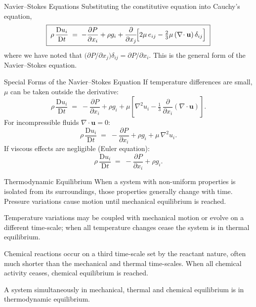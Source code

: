 \documentclass[10pt,aspectratio=43]{beamer}
\newcommand{\D}{\mathrm{D}}
\newcommand{\pd}[2]{\frac{\partial #1}{\partial #2}}
\newcommand{\bu}{\mathbf{u}}
\newcommand{\divg}{\nabla\!\cdot}
\begin{document}
\begin{frame}{Navier--Stokes Equations}
  Substituting the constitutive equation into Cauchy's equation,
  \[
    \boxed{\;\rho\,\frac{\D u_{i}}{\D t}
       \;=\; -\pd{P}{x_{i}} + \rho g_{i}
             + \pd{}{x_{j}}\!\Bigl[2\mu\,e_{ij} - \tfrac{2}{3}\mu\,(\divg\bu)\,\delta_{ij}\Bigr]\;}
  \]
  where we have noted that $\bigl(\partial P/\partial x_{j}\bigr)\delta_{ij}=\partial P/\partial x_{i}$.
  This is the general form of the Navier--Stokes equation.
\end{frame}

\begin{frame}{Special Forms of the Navier--Stokes Equation}
  If temperature differences are small, $\mu$ can be taken outside the
  derivative:
  \[
    \rho\,\frac{\D u_{i}}{\D t}
       \;=\; -\pd{P}{x_{i}} + \rho g_{i}
             + \mu\!\left[\nabla^{2} u_{i} - \tfrac{1}{3}\,\pd{}{x_{i}}(\divg\bu)\right].
  \]
  For incompressible fluids $\divg\bu=0$:
  \[
    \rho\,\frac{\D u_{i}}{\D t}
       \;=\; -\pd{P}{x_{i}} + \rho g_{i} + \mu\,\nabla^{2} u_{i}.
  \]
  If viscous effects are negligible (\alert{Euler equation}):
  \[
    \rho\,\frac{\D u_{i}}{\D t}
       \;=\; -\pd{P}{x_{i}} + \rho g_{i}.
  \]
\end{frame}

\begin{frame}{Thermodynamic Equilibrium}
  When a system with non-uniform properties is isolated from its
  surroundings, those properties generally change with time. Pressure
  variations cause motion until \alert{mechanical equilibrium} is reached.

  \medskip
  Temperature variations may be coupled with mechanical motion or evolve on
  a different time-scale; when all temperature changes cease the system is
  in \alert{thermal equilibrium}.

  \medskip
  Chemical reactions occur on a third time-scale set by the reactant
  nature, often much shorter than the mechanical and thermal time-scales.
  When all chemical activity ceases, \alert{chemical equilibrium} is
  reached.

  \medskip
  A system simultaneously in mechanical, thermal and chemical equilibrium
  is in \alert{thermodynamic equilibrium}.
\end{frame}
\end{document}
